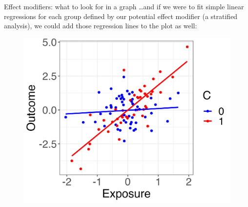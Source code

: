 \documentclass[10pt,t]{beamer}
\begin{document}
\begin{frame}{Effect modifiers: what to look for in a graph}
\dots and if we were to fit simple linear regressions for each group defined by our potential effect modifier (a stratified analysis), we could add those regression lines to the plot as well:

\vspace{0.3cm}

\begin{figure}
	\centering \includegraphics[scale=0.4]{p4.png}
\end{figure}

\end{frame}
\end{document}
